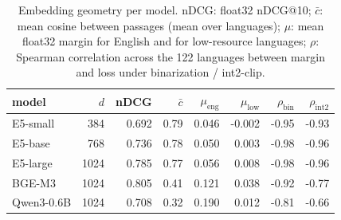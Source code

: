 \begin{table}[t]\centering\footnotesize
\setlength{\tabcolsep}{2pt}\begin{tabular}{lrrrrrrr}
\toprule
model & $d$ & nDCG & $\bar{c}$ & $\mu_{\mathrm{eng}}$ & $\mu_{\mathrm{low}}$ & $\rho_{\mathrm{bin}}$ & $\rho_{\mathrm{int2}}$ \\
\midrule
E5-small & 384 & 0.692 & 0.79 & 0.046 & -0.002 & -0.95 & -0.93 \\
E5-base & 768 & 0.736 & 0.78 & 0.050 & 0.003 & -0.98 & -0.96 \\
E5-large & 1024 & 0.785 & 0.77 & 0.056 & 0.008 & -0.98 & -0.96 \\
BGE-M3 & 1024 & 0.805 & 0.41 & 0.121 & 0.038 & -0.92 & -0.77 \\
Qwen3-0.6B & 1024 & 0.708 & 0.32 & 0.190 & 0.012 & -0.81 & -0.66 \\
\bottomrule
\end{tabular}
\caption{Embedding geometry per model. nDCG: float32 nDCG@10; $\bar{c}$: mean cosine between passages (mean over languages); $\mu$: mean float32 margin for English and for low-resource languages; $\rho$: Spearman correlation across the 122 languages between margin and loss under binarization / int2-clip.}\label{tab:geom}
\end{table}